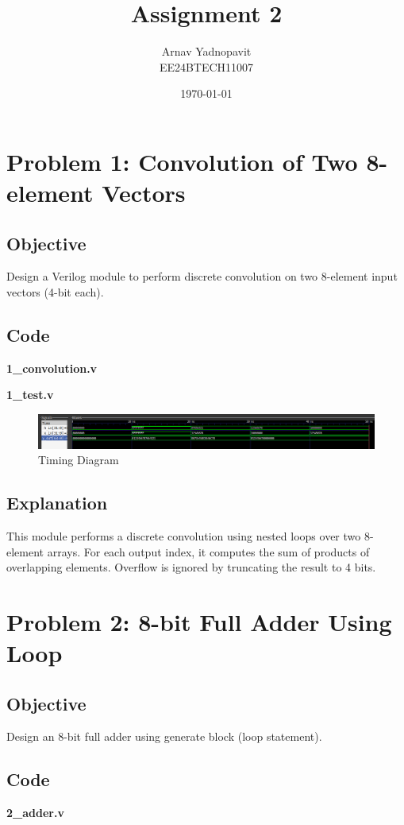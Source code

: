 \documentclass[12pt]{article}
\title{Assignment 2}
\author{Arnav Yadnopavit\\EE24BTECH11007}
\date{\today}
\begin{document}
\maketitle

\section{Problem 1: Convolution of Two 8-element Vectors}
\subsection*{Objective}
Design a Verilog module to perform discrete convolution on two 8-element input vectors (4-bit each).

\subsection*{Code}
\textbf{1\_convolution.v}



\textbf{1\_test.v}

\begin{figure}[H]
    \centering
    \includegraphics[width=\textwidth]{figs/1/test.png} 
    \caption{Timing Diagram}
\end{figure}
\subsection*{Explanation}
This module performs a discrete convolution using nested loops over two 8-element arrays. For each output index, it computes the sum of products of overlapping elements. Overflow is ignored by truncating the result to 4 bits.

\section{Problem 2: 8-bit Full Adder Using Loop}
\subsection*{Objective}
Design an 8-bit full adder using generate block (loop statement).

\subsection*{Code}
\textbf{2\_adder.v}

\end{document}
